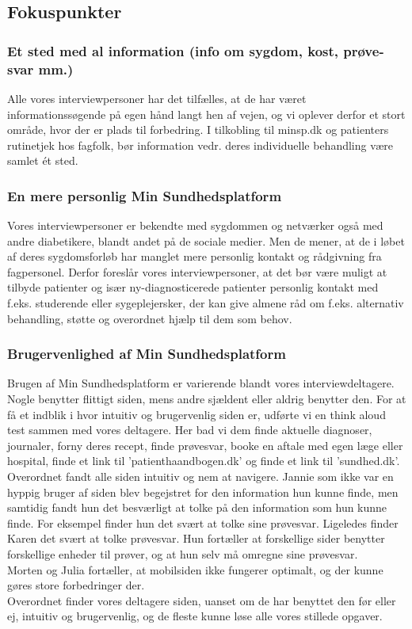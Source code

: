 \subsection{Fokuspunkter}
\subsubsection{Et sted med al information (info om sygdom, kost, prøve-svar mm.)}
Alle vores interviewpersoner har det tilfælles, at de har været informationssøgende på egen hånd langt hen af vejen, og vi oplever derfor et stort område, hvor der er plads til forbedring. I tilkobling til minsp.dk og patienters rutinetjek hos fagfolk, bør information vedr. deres individuelle behandling være samlet ét sted.

\subsubsection{En mere personlig Min Sundhedsplatform}
Vores interviewpersoner er bekendte med sygdommen og netværker også med andre diabetikere, blandt andet på de sociale medier. Men de mener, at de i løbet af deres sygdomsforløb har manglet mere personlig kontakt og rådgivning fra fagpersonel. Derfor foreslår vores interviewpersoner, at det bør være muligt at tilbyde patienter og især ny-diagnosticerede patienter personlig kontakt med f.eks. studerende eller sygeplejersker, der kan give almene råd om f.eks. alternativ behandling, støtte og overordnet hjælp til dem som behov.

\subsubsection{Brugervenlighed af Min Sundhedsplatform}
Brugen af Min Sundhedsplatform er varierende blandt vores interviewdeltagere. Nogle benytter flittigt siden, mens andre sjældent eller aldrig benytter den. For at få et indblik i hvor intuitiv og brugervenlig siden er, udførte vi en think aloud test sammen med vores deltagere. Her bad vi dem finde aktuelle diagnoser, journaler, forny deres recept, finde prøvesvar, booke en aftale med egen læge eller hospital, finde et link til 'patienthaandbogen.dk' og finde et link til 'sundhed.dk'. Overordnet fandt alle siden intuitiv og nem at navigere. Jannie som ikke var en hyppig bruger af siden blev begejstret for den information hun kunne finde, men samtidig fandt hun det besværligt at tolke på den information som hun kunne finde. For eksempel finder hun det svært at tolke sine prøvesvar. Ligeledes finder Karen det svært at tolke prøvesvar. Hun fortæller at forskellige sider benytter forskellige enheder til prøver, og at hun selv må omregne sine prøvesvar.\\
Morten og Julia fortæller, at mobilsiden ikke fungerer optimalt, og der kunne gøres store forbedringer der.\\
Overordnet finder vores deltagere siden, uanset om de har benyttet den før eller ej, intuitiv og brugervenlig, og de fleste kunne løse alle vores stillede opgaver.

